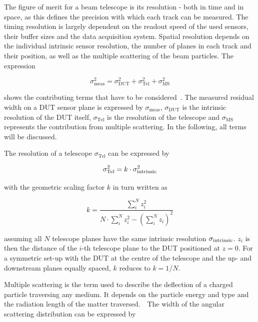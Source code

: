 The figure of merit for a beam telescope is its resolution  - both in time and in space, as this defines the precision with which each track can be measured. 
The timing resolution is largely dependent on the readout speed of the used sensors, their buffer sizes and the data acquisition system. 
Spatial resolution depends on the individual intrinsic sensor resolution, the number of planes in each track and their position, as well as the multiple scattering of the beam particles. 
The expression

\begin{equation}
\label{eq:telescoperesolutionequation}
\sigma_{\textrm{meas}}^2 = \sigma_{\textrm{DUT}}^2 + \sigma_{\textrm{Tel}}^2 +
\sigma_{\textrm{MS}}^2
\end{equation}

\noindent shows the contributing terms that have to be considered~\cite{ref:eudetreport200902}. 
The measured residual width on a DUT sensor plane is expressed by $\sigma_{\textrm{meas}}$, $\sigma_{\textrm{DUT}}$ is the intrinsic resolution of the DUT itself,
 $\sigma_{\textrm{Tel}}$ is the resolution of the telescope and $\sigma_{\textrm{MS}}$ represents the contribution from multiple scattering.
In the following, all terms will be discussed.

The resolution of a telescope $\sigma_{\textrm{Tel}}$ can be expressed by

\begin{equation}
\label{eq:telescopepointing}
\sigma_{\textrm{Tel}}^2 = k \cdot \sigma_{\textrm{intrinsic}}^2
\end{equation}

\noindent with the geometric scaling factor $k$ in turn written as

\begin{equation}
k = \frac{\sum_i^N z_i^2}{N \cdot \sum_i^N z_i^2 - \left( \sum_i^N z_i \right)^2}
\end{equation}

\noindent assuming all $N$ telescope planes have the same intrinsic resolution $\sigma_{\textrm{intrinsic}}$. 
$z_i$ is then the distance of the $i$-th telescope plane to the DUT positioned at $z=0$.
For a symmetric set-up with the DUT at the centre of the telescope and the up- and downstream planes equally spaced, $k$ reduces to $k = 1/N$. 

Multiple scattering is the term used to describe the deflection of a charged particle traversing any medium.
It depends on the particle energy and type and the radiation length of the matter traversed.\,~\cite{ref:scatteringhighland}
The width of the angular scattering distribution can be expressed by

